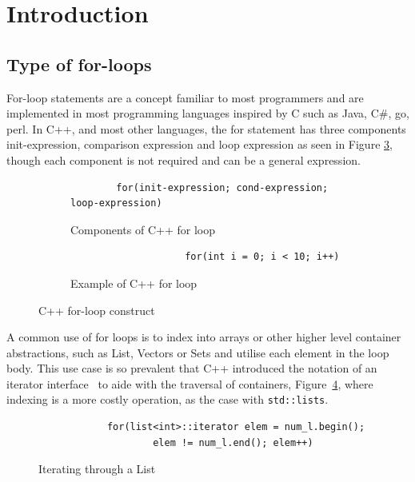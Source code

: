 \documentclass[bsc,frontabs,singlespacing,twoside,parskip,deptreport]{infthesis}
\begin{document}
\section{Introduction}
\subsection{Type of for-loops}
For-loop statements are a concept familiar to most programmers and are implemented in most programming languages inspired by C such as Java, C\#, go, perl. In C++, and most other languages, the for statement has three components init-expression, comparison expression and loop expression as seen in Figure \ref{fig:code-for-loop}, though each component is not required and can be a general expression. 

\begin{figure}[H]
    \centering
    \begin{subfigure}[h]{\textwidth}
        \centering
        \begin{verbatim}
        for(init-expression; cond-expression; loop-expression)
        \end{verbatim}
        \caption{Components of C++ for loop}
        \label{fig:code-for-loop-components}
        \vspace{0.40cm}
    \end{subfigure}
    
    \begin{subfigure}[h]{\textwidth}
    \begin{verbatim}
                    for(int i = 0; i < 10; i++)
    \end{verbatim}
    \caption{Example of C++ for loop}
    \centering
    \label{fig:code-for-loop-example}
    \end{subfigure}
    \caption{C++ for-loop construct}
    \label{fig:code-for-loop}
\end{figure}

A common use of for loops is to index into arrays or other higher level container abstractions, such as List, Vectors or Sets and utilise each element in the loop body. This use case is so prevalent that C++ introduced the notation of an iterator interface~\cite{ITER_CPP} to aide with the traversal of containers, Figure~\ref{fig:code-iterator}, where indexing is a more costly operation, as the case with \texttt{std::lists}. 

\begin{figure}[H]
    \begin{verbatim}
            for(list<int>::iterator elem = num_l.begin();
                    elem != num_l.end(); elem++)
    \end{verbatim}
    \caption{Iterating through a List}
    \centering
    \label{fig:code-iterator}
\end{figure}
\end{document}
